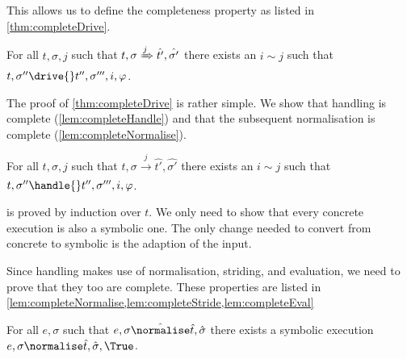 This allows us to define the completeness property as listed in \cref{thm:completeDrive}.

%



\begin{theorem}
  \label{thm:completeDrive}
  For all $t,\sigma,j$ such that $t,\sigma \xRightarrow[]{j} \hat{t'},\hat{\sigma'}$
  there exists an $i\sim j$ such that $t,\sigma''\drive{} t'',\sigma''',i,\phi$.
\end{theorem}


The proof of \cref{thm:completeDrive} is rather simple.
We show that handling is complete (\cref{lem:completeHandle})
and that the subsequent normalisation is complete (\cref{lem:completeNormalise}).


\begin{lemma}
  \label{lem:completeHandle}
  For all $t,\sigma,j$ such that $t,\sigma \xrightarrow[]{j} \hat{t'},\hat{\sigma'}$
  there exists an $i\sim j$ such that $t,\sigma''\handle{} t'',\sigma''',i,\phi$.
\end{lemma}

 is proved by induction over $t$.
We only need to show that every concrete execution is also a symbolic one.
The only change needed to convert from concrete to symbolic is the adaption of the input.

Since handling makes use of normalisation, striding, and evaluation, we need to prove that they too are complete.
These properties are listed in \cref{lem:completeNormalise,lem:completeStride,lem:completeEval}

\begin{lemma}
  \label{lem:completeNormalise}
  For all $e,\sigma$ such that $e,\sigma \hat{\normalise}\hat{t},\hat{\sigma}$
  there exists a symbolic execution $e,\sigma\normalise \hat{t},\hat{\sigma},\True$.
\end{lemma}

